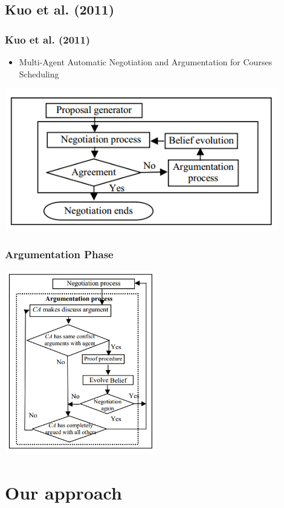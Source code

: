 \documentclass{beamer}
\begin{document}
\subsection{Kuo et al. (2011)}
\begin{frame}
\frametitle{Kuo et al. (2011)}
\begin{itemize}
\item Multi-Agent Automatic Negotiation and Argumentation for Courses Scheduling
\end{itemize}
\center
\includegraphics[width=0.9\textwidth]{Kuo1.png}
\end{frame}

\begin{frame}
\frametitle{Argumentation Phase}
\center
\includegraphics[width=0.5\textwidth]{Kuo2.png}
\end{frame}

\section{Our approach}
\end{document}
